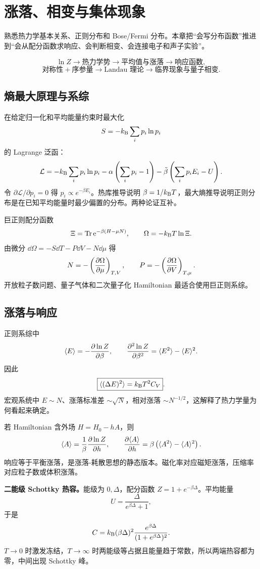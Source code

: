 \chapter{涨落、相变与集体现象}

\begin{prereqbox}
熟悉热力学基本关系、正则分布和 Bose/Fermi 分布。本章把“会写分布函数”推进到“会从配分函数求响应、会判断相变、会连接电子和声子实验”。
\end{prereqbox}
\begin{mapbox}
\[
\ln Z\to\text{热力学势}\to\text{平均值与涨落}\to\text{响应函数},
\]
\[
\text{对称性}+\text{序参量}\to\text{Landau 理论}\to
\text{临界现象与量子相变}.
\]
\end{mapbox}

\section{熵最大原理与系综}
在给定归一化和平均能量约束时最大化
\[
S=-k_{\mathrm B}\sum_i p_i\ln p_i
\]
的 Lagrange 泛函：
\[
\mathcal L=-k_{\mathrm B}\sum_i p_i\ln p_i
-\alpha\left(\sum_i p_i-1\right)
-\tilde\beta\left(\sum_i p_iE_i-U\right).
\]
令 $\partial\mathcal L/\partial p_i=0$ 得
$p_i\propto e^{-\beta E_i}$。热库推导说明 $\beta=1/k_{\mathrm B} T$，最大熵推导说明正则分布是在已知平均能量时最少偏置的分布。两种论证互补。

巨正则配分函数
\[
\Xi=\mathrm{Tr}\,\mathrm e^{-\beta(H-\mu N)},\qquad
\Omega=-k_{\mathrm B} T\ln\Xi.
\]
由微分
$\dd\Omega=-S\dd T-P\dd V-N\dd\mu$ 得
\[
N=-\left(\frac{\partial \Omega}{\partial \mu}\right)_{T,V},\qquad
P=-\left(\frac{\partial \Omega}{\partial V}\right)_{T,\mu}.
\]
开放粒子数问题、量子气体和二次量子化 Hamiltonian 最适合使用巨正则系综。

\section{涨落与响应}
正则系综中
\[
\langle E\rangle=-\frac{\partial \ln Z}{\partial \beta},\qquad
\frac{\partial^2\ln Z}{\partial\beta^2}
=\langle E^2\rangle-\langle E\rangle^2.
\]
因此
\[
\boxed{\langle(\Delta E)^2\rangle=k_{\mathrm B} T^2C_V}.
\]
宏观系统中 $E\sim N$、涨落标准差 $\sim\sqrt N$，相对涨落 $\sim N^{-1/2}$，这解释了热力学量为何看起来确定。

若 Hamiltonian 含外场 $H=H_0-hA$，则
\[
\langle A\rangle=\frac1\beta\frac{\partial \ln Z}{\partial h},
\qquad
\frac{\partial \langle A\rangle}{\partial h}
=\beta\left(\langle A^2\rangle-\langle A\rangle^2\right).
\]
响应等于平衡涨落，是涨落-耗散思想的静态版本。磁化率对应磁矩涨落，压缩率对应粒子数或体积涨落。

\begin{examplebox}
\textbf{二能级 Schottky 热容。}能级为 $0,\Delta$，配分函数
$Z=1+e^{-\beta\Delta}$。平均能量
\[
U=\frac{\Delta}{e^{\beta\Delta}+1},
\]
于是
\[
C=k_{\mathrm B}(\beta\Delta)^2\frac{e^{\beta\Delta}}
{(1+e^{\beta\Delta})^2}.
\]
$T\to0$ 时激发冻结，$T\to\infty$ 时两能级等占据且能量趋于常数，所以两端热容都为零，中间出现 Schottky 峰。
\end{examplebox}


